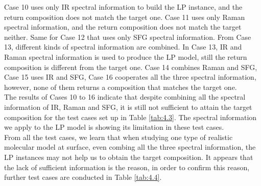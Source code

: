Case 10 uses only IR spectral information to build the LP instance, and the return composition does not match the target one. Case 11 uses only Raman spectral information, and the return composition does not match the target neither. Same for Case 12 that uses only SFG spectral information. From Case 13, different kinds of spectral information are combined. In Case 13, IR and Raman spectral information is used to produce the LP model, still the return composition is different from the target one. Case 14 combines Raman and SFG, Case 15 uses IR and SFG, Case 16 cooperates all the three spectral information, however, none of them returns a composition that matches the target one. \\

The results of Cases 10 to 16 indicate that despite combining all the spectral information of IR, Raman and SFG, it is still not sufficient to attain the target composition for the test cases set up in Table \ref{tab:4.3}. The spectral information we apply to the LP model is showing its limitation in these test cases. \\

From all the test cases, we learn that when studying one type of realistic molecular model at surface, even combing all the three spectral information, the LP instances may not help us to obtain the target composition. It appears that the lack of sufficient information is the reason, in order to confirm this reason, further test cases are conducted in Table \ref{tab:4.4}. \\

